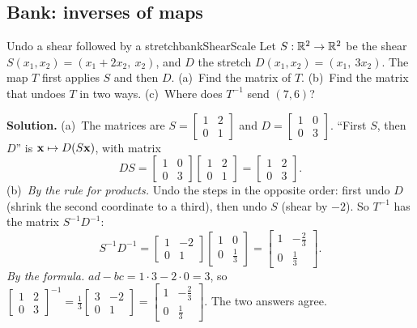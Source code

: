 \documentclass[11pt]{article}
\begin{document}
\subsection*{Bank: inverses of maps}

\begin{exmp}{Undo a shear followed by a stretch}{bankShearScale}
Let $S:\mathbb{R}^2\to\mathbb{R}^2$ be the shear $S(x_1,x_2)=(x_1+2x_2,\ x_2)$, and $D$ the stretch $D(x_1,x_2)=(x_1,\ 3x_2)$. The map $T$ first applies $S$ and then $D$. (a)~Find the matrix of $T$. (b)~Find the matrix that undoes $T$ in two ways. (c)~Where does $T^{-1}$ send $(7,6)$?

\textbf{Solution.} (a)~The matrices are $S=\begin{bmatrix}1&2\\0&1\end{bmatrix}$ and $D=\begin{bmatrix}1&0\\0&3\end{bmatrix}$. ``First $S$, then $D$'' is $\mathbf{x}\mapsto D(S\mathbf{x})$, with matrix
\[
DS=\begin{bmatrix}1&0\\0&3\end{bmatrix}\begin{bmatrix}1&2\\0&1\end{bmatrix}=\begin{bmatrix}1&2\\0&3\end{bmatrix}.
\]
(b)~\emph{By the rule for products.} Undo the steps in the opposite order: first undo $D$ (shrink the second coordinate to a third), then undo $S$ (shear by $-2$). So $T^{-1}$ has the matrix $S^{-1}D^{-1}$:
\[
S^{-1}D^{-1}=\begin{bmatrix}1&-2\\0&1\end{bmatrix}\begin{bmatrix}1&0\\0&\tfrac13\end{bmatrix}=\begin{bmatrix}1&-\tfrac23\\0&\tfrac13\end{bmatrix}.
\]
\emph{By the formula.} $ad-bc=1\cdot3-2\cdot0=3$, so $\begin{bmatrix}1&2\\0&3\end{bmatrix}^{-1}=\frac13\begin{bmatrix}3&-2\\0&1\end{bmatrix}=\begin{bmatrix}1&-\tfrac23\\0&\tfrac13\end{bmatrix}$. The two answers agree.


\end{exmp}
\end{document}
